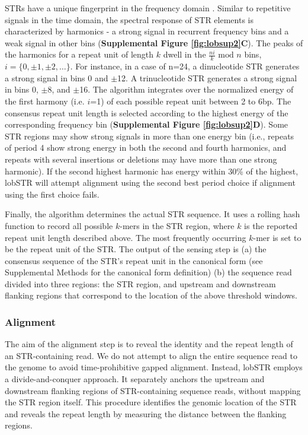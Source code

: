STRs have a unique fingerprint in the frequency domain \cite{SharmaIssacRaghavaEtAl2004,ZhouDuYan2009}. Similar to repetitive signals in the time domain, the spectral response of STR elements is characterized by harmonics - a strong signal in recurrent frequency bins and a weak signal in other bins (\textbf{Supplemental Figure \ref{fig:lobsup2}C}). The peaks of the harmonics for a repeat unit of length $k$ dwell in the $\frac{ni}{k} \text{ mod } n$ bins, $i = \{ 0, \pm 1, \pm 2, \hdots \}$. For instance, in a case of n=24, a dinucleotide STR generates a strong signal in bins 0 and $\pm$12. A trinucleotide STR generates a strong signal in bins 0, $\pm$8, and $\pm$16. The algorithm integrates over the normalized energy of the first harmony (i.e. $i$=1) of each possible repeat unit between 2 to 6bp. The consensus repeat unit length is selected according to the highest energy of the corresponding frequency bin (\textbf{Supplemental Figure \ref{fig:lobsup2}D}). Some STR regions may show strong signals in more than one energy bin (i.e., repeats of period 4 show strong energy in both the second and fourth harmonics, and repeats with several insertions or deletions may have more than one strong harmonic). If the second highest harmonic has energy within 30\% of the highest, lobSTR will attempt alignment using the second best period choice if alignment using the first choice fails.

Finally, the algorithm determines the actual STR sequence. It uses a rolling hash function to record all possible $k$-mers in the STR region, where $k$ is the reported repeat unit length described above. The most frequently occurring $k$-mer is set to be the repeat unit of the STR. The output of the sensing step is (a) the consensus sequence of the STR's repeat unit in the canonical form (see Supplemental Methods for the canonical form definition) (b) the sequence read divided into three regions: the STR region, and upstream and downstream flanking regions that correspond to the location of the above threshold windows. 

\subsubsection{Alignment}
The aim of the alignment step is to reveal the identity and the repeat length of an STR-containing read. We do not attempt to align the entire sequence read to the genome to avoid time-prohibitive gapped alignment. Instead, lobSTR employs a divide-and-conquer approach. It separately anchors the upstream and downstream flanking regions of STR-containing sequence reads, without mapping the STR region itself. This procedure identifies the genomic location of the STR and reveals the repeat length by measuring the distance between the flanking regions.

